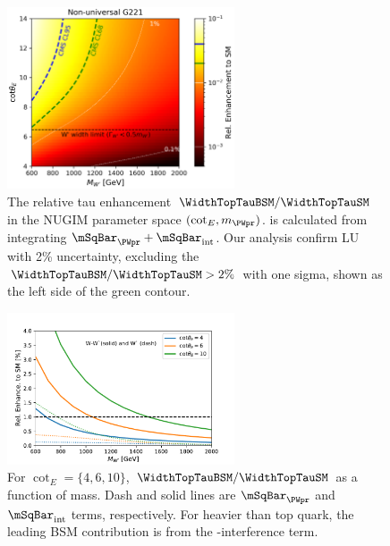 \begin{figure}
    \centering
    \includegraphics[width=0.6\textwidth]{chapters/RelatedWorks/sectionBSM/figures/RelEnhance.png} 
    \caption{The relative tau enhancement $ \WidthTopTauBSM/  \WidthTopTauSM $ in the NUGIM parameter space $(\cot_E, m_{\PWpr})$. \WidthTopTauBSM is calculated from integrating $\mSqBar _{\PWpr} +  \mSqBar _{\mathrm{int}}$.  Our analysis confirm LU with 2\% uncertainty, excluding the $ \WidthTopTauBSM/  \WidthTopTauSM > 2\% $ with one sigma, shown as the left side of the green contour.}
    \label{fig:relatedWorks:bsm:WPrime:tauEnhancement}
\end{figure}


\begin{figure}
    \centering
    \includegraphics[width=0.6\textwidth]{chapters/RelatedWorks/sectionBSM/figures/RelEnhance1D.pdf} 
    \caption{For $\cot_E=\{4,6,10\}$, $\WidthTopTauBSM/  \WidthTopTauSM $ as a function of \PWpr mass. Dash and solid lines are $\mSqBar _{\PWpr} $ and $\mSqBar _{\mathrm{int}}$  terms, respectively. For \PWpr heavier than top quark, the leading BSM contribution is from the \PW-\PWpr interference term. }
    \label{fig:relatedWorks:bsm:WPrime:tauEnhancement1d}
\end{figure}



